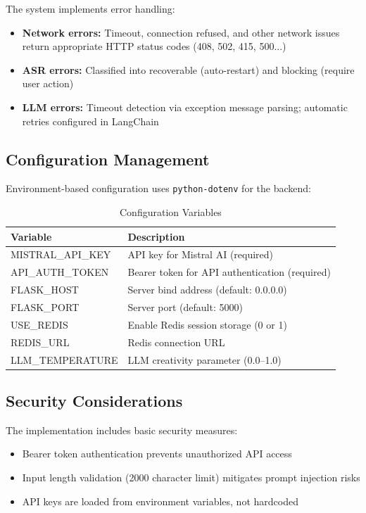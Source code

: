 \documentclass[a4paper]{article}
\begin{document}
The system implements error handling:

\begin{itemize}[noitemsep]
    \item \textbf{Network errors:} Timeout, connection refused, and other network issues return appropriate HTTP status codes (408, 502, 415, 500...)
    \item \textbf{ASR errors:} Classified into recoverable (auto-restart) and blocking (require user action)
    \item \textbf{LLM errors:} Timeout detection via exception message parsing; automatic retries configured in LangChain
\end{itemize}

\subsection{Configuration Management}

Environment-based configuration uses \texttt{python-dotenv} for the backend:

\begin{table}[htbp]
    \centering
    \caption{Configuration Variables}
    \label{tab:config}
    \begin{tabular}{@{}lp{8cm}@{}}
        \toprule
        \textbf{Variable} & \textbf{Description} \\
        \midrule
        MISTRAL\_API\_KEY & API key for Mistral AI (required) \\
        API\_AUTH\_TOKEN & Bearer token for API authentication (required) \\
        FLASK\_HOST & Server bind address (default: 0.0.0.0) \\
        FLASK\_PORT & Server port (default: 5000) \\
        USE\_REDIS & Enable Redis session storage (0 or 1) \\
        REDIS\_URL & Redis connection URL \\
        LLM\_TEMPERATURE & LLM creativity parameter (0.0--1.0) \\
        \bottomrule
    \end{tabular}
\end{table}

\subsection{Security Considerations}

The implementation includes basic security measures:
\begin{itemize}[noitemsep]
    \item Bearer token authentication prevents unauthorized API access
    \item Input length validation (2000 character limit) mitigates prompt injection risks
    \item API keys are loaded from environment variables, not hardcoded
\end{itemize}
\end{document}

